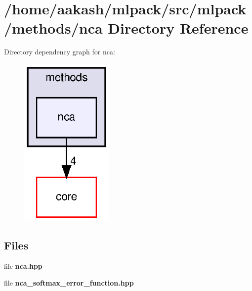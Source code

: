 \section{/home/aakash/mlpack/src/mlpack/methods/nca Directory Reference}
\label{dir_dcee21e1606ddff0b2f71b477ed9280c}
Directory dependency graph for nca\+:
\nopagebreak
\begin{figure}[H]
\begin{center}
\leavevmode
\includegraphics[width=130pt]{dir_dcee21e1606ddff0b2f71b477ed9280c_dep}
\end{center}
\end{figure}
\subsection*{Files}
\begin{DoxyCompactItemize}
\item 
file \textbf{ nca.\+hpp}
\item 
file \textbf{ nca\+\_\+softmax\+\_\+error\+\_\+function.\+hpp}
\end{DoxyCompactItemize}
